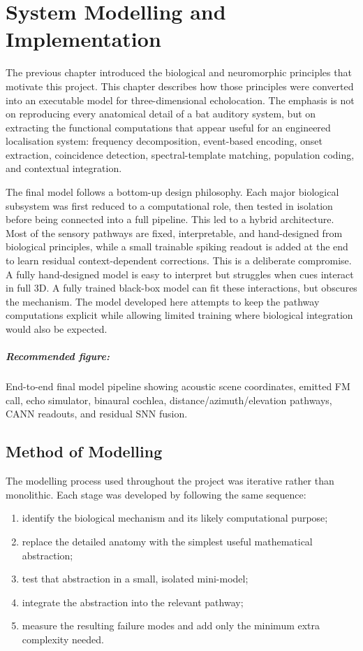 \chapter{System Modelling and Implementation}

The previous chapter introduced the biological and neuromorphic principles that motivate this project. This chapter describes how those principles were converted into an executable model for three-dimensional echolocation. The emphasis is not on reproducing every anatomical detail of a bat auditory system, but on extracting the functional computations that appear useful for an engineered localisation system: frequency decomposition, event-based encoding, onset extraction, coincidence detection, spectral-template matching, population coding, and contextual integration.

The final model follows a bottom-up design philosophy. Each major biological subsystem was first reduced to a computational role, then tested in isolation before being connected into a full pipeline. This led to a hybrid architecture. Most of the sensory pathways are fixed, interpretable, and hand-designed from biological principles, while a small trainable spiking readout is added at the end to learn residual context-dependent corrections. This is a deliberate compromise. A fully hand-designed model is easy to interpret but struggles when cues interact in full 3D. A fully trained black-box model can fit these interactions, but obscures the mechanism. The model developed here attempts to keep the pathway computations explicit while allowing limited training where biological integration would also be expected.

\paragraph{Recommended figure:} End-to-end final model pipeline showing acoustic scene coordinates, emitted FM call, echo simulator, binaural cochlea, distance/azimuth/elevation pathways, CANN readouts, and residual SNN fusion.

\section{Method of Modelling}

The modelling process used throughout the project was iterative rather than monolithic. Each stage was developed by following the same sequence:
\begin{enumerate}
    \item identify the biological mechanism and its likely computational purpose;
    \item replace the detailed anatomy with the simplest useful mathematical abstraction;
    \item test that abstraction in a small, isolated mini-model;
    \item integrate the abstraction into the relevant pathway;
    \item measure the resulting failure modes and add only the minimum extra complexity needed.
\end{enumerate}

